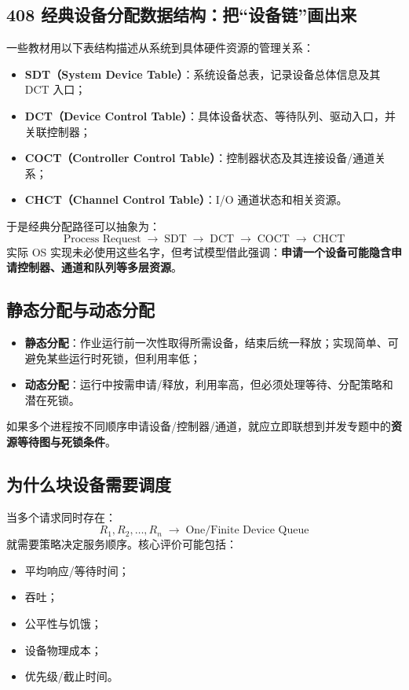 \documentclass[UTF8,fontset=fandol,11pt,a4paper]{ctexart}
\newcommand{\kw}[1]{\textbf{#1}}
\newcommand{\arr}{\;\longrightarrow\;}
\begin{document}
\subsection{408 经典设备分配数据结构：把“设备链”画出来}
一些教材用以下表结构描述从系统到具体硬件资源的管理关系：
\begin{itemize}
  \item \kw{SDT（System Device Table）}：系统设备总表，记录设备总体信息及其 DCT 入口；
  \item \kw{DCT（Device Control Table）}：具体设备状态、等待队列、驱动入口，并关联控制器；
  \item \kw{COCT（Controller Control Table）}：控制器状态及其连接设备/通道关系；
  \item \kw{CHCT（Channel Control Table）}：I/O 通道状态和相关资源。
\end{itemize}
于是经典分配路径可以抽象为：
\[
\boxed{\text{Process Request}\arr\text{SDT}\arr\text{DCT}\arr\text{COCT}\arr\text{CHCT}}
\]
实际 OS 实现未必使用这些名字，但考试模型借此强调：\kw{申请一个设备可能隐含申请控制器、通道和队列等多层资源}。

\subsection{静态分配与动态分配}
\begin{itemize}
  \item \kw{静态分配}：作业运行前一次性取得所需设备，结束后统一释放；实现简单、可避免某些运行时死锁，但利用率低；
  \item \kw{动态分配}：运行中按需申请/释放，利用率高，但必须处理等待、分配策略和潜在死锁。
\end{itemize}
如果多个进程按不同顺序申请设备/控制器/通道，就应立即联想到并发专题中的\kw{资源等待图与死锁条件}。

\subsection{为什么块设备需要调度}
当多个请求同时存在：
\[
R_1,R_2,\ldots,R_n\arr\boxed{\text{One/Finite Device Queue}}
\]
就需要策略决定服务顺序。核心评价可能包括：
\begin{itemize}
  \item 平均响应/等待时间；
  \item 吞吐；
  \item 公平性与饥饿；
  \item 设备物理成本；
  \item 优先级/截止时间。
\end{itemize}
\end{document}
